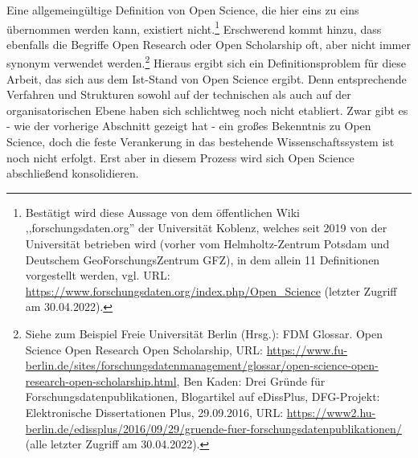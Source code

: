 Eine allgemeingültige Definition von Open Science, die hier eins zu eins übernommen werden kann, existiert nicht.\footnote{Bestätigt wird diese Aussage von dem öffentlichen Wiki ,,forschungsdaten.org'' der Universität Koblenz, welches seit 2019 von der Universität betrieben wird (vorher vom Helmholtz-Zentrum Potsdam und Deutschem GeoForschungsZentrum GFZ), in dem allein 11 Definitionen vorgestellt werden, vgl. URL: \url{https://www.forschungsdaten.org/index.php/Open_Science} (letzter Zugriff am 30.04.2022).} Erschwerend kommt hinzu, dass ebenfalls die Begriffe Open Research oder Open Scholarship oft, aber nicht immer synonym verwendet werden.\footnote{Siehe zum Beispiel Freie Universität Berlin (Hrsg.): FDM Glossar. Open Science\/ Open Research\/ Open Scholarship, URL: \url{https://www.fu-berlin.de/sites/forschungsdatenmanagement/glossar/open-science-open-research-open-scholarship.html}, Ben Kaden: Drei Gründe für Forschungsdatenpublikationen, Blogartikel auf eDissPlus, DFG-Projekt: Elektronische Dissertationen Plus, 29.09.2016, URL: \url{https://www2.hu-berlin.de/edissplus/2016/09/29/gruende-fuer-forschungsdatenpublikationen/} (alle letzter Zugriff am 30.04.2022).} Hieraus ergibt sich ein Definitionsproblem für diese Arbeit, das sich aus dem Ist-Stand von Open Science ergibt. Denn entsprechende Verfahren und Strukturen sowohl auf der technischen als auch auf der organisatorischen Ebene haben sich schlichtweg noch nicht etabliert. Zwar gibt es - wie der vorherige Abschnitt gezeigt hat - ein großes Bekenntnis zu Open Science, doch die feste Verankerung in das bestehende Wissenschaftssystem ist noch nicht erfolgt. Erst aber in diesem Prozess wird sich Open Science abschließend konsolidieren. 

